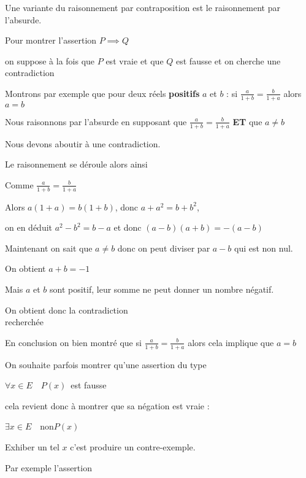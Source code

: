 \diapo

Une variante du raisonnement par contraposition est le raisonnement par l'absurde.

Pour montrer  l'assertion \og $P \implies Q$\fg\ 

on suppose à la fois que $P$ est vraie et que $Q$ est fausse 
et on cherche une contradiction

\change

Montrons par exemple que pour deux réels \textbf{positifs} $a$ et $b$ : si $\frac{a}{1+b}=\frac{b}{1+a}$
alors $a=b$

\change

Nous raisonnons par l'absurde en supposant 
que  $\frac{a}{1+b}=\frac{b}{1+a}$ \textbf{ET} que $a \neq b$


\change

Nous devons aboutir à une contradiction.


\change 

Le raisonnement se déroule alors ainsi 

Comme  $\frac{a}{1+b}=\frac{b}{1+a}$

 Alors $a(1+a)=b(1+b)$, donc $a+a^2=b+b^2$, 

on en déduit $a^2-b^2 = b-a$ et donc $(a-b)(a+b)= -(a-b)$


Maintenant on sait que $a \neq b$ donc on peut diviser par $a-b$ qui est non nul.

On obtient  $a+b=-1$

Mais $a$ et $b$ sont positif, leur somme ne peut donner un nombre négatif.

On obtient donc la contradiction\\
recherchée

\change

En conclusion on bien montré que
si $\frac{a}{1+b}=\frac{b}{1+a}$ 
alors cela implique que $a=b$

\diapo


On souhaite parfois montrer qu'une assertion du type 

\og $\forall x \in E \quad P(x)$\fg\ est fausse

cela revient donc à montrer que sa négation est vraie :

\og $\exists x \in E \quad \text{non} P(x)$\fg\ 

Exhiber un tel $x$ c'est produire un contre-exemple.

\change
Par exemple l'assertion 

